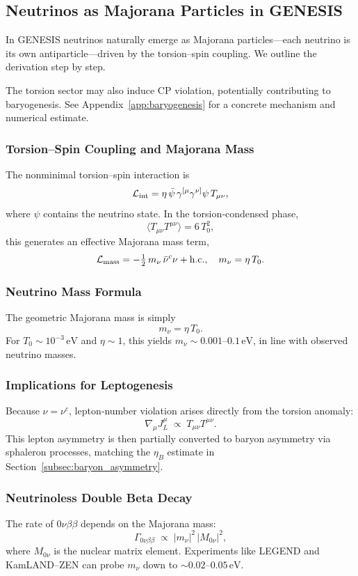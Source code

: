 \documentclass{article}
\begin{document}
\subsection{Neutrinos as Majorana Particles in GENESIS}
\label{subsec:majorana_neutrino}

In GENESIS neutrinos naturally emerge as Majorana particles—each neutrino
is its own antiparticle—driven by the torsion–spin coupling.  We outline the
derivation step by step.

The torsion sector may also induce CP violation, potentially contributing to baryogenesis.
See Appendix~\ref{app:baryogenesis} for a concrete mechanism and numerical estimate.


\subsubsection{ Torsion–Spin Coupling and Majorana Mass}
The nonminimal torsion–spin interaction is
\[
  \mathcal L_{\rm int}
  = \eta\,\bar\psi\,\gamma^{[\mu}\gamma^{\nu]}\psi\,T_{\mu\nu},
\]
where \(\psi\) contains the neutrino state.  In the torsion‐condensed phase,
\[
  \bigl\langle T_{\mu\nu}T^{\mu\nu}\bigr\rangle
    = 6\,T_0^2,
\]
this generates an effective Majorana mass term,
\[
  \mathcal L_{\rm mass}
  = -\tfrac12\,m_\nu\,\bar\nu^c\nu
    + \text{h.c.}, 
  \quad
  m_\nu = \eta\,T_0.
\]

\subsubsection{ Neutrino Mass Formula}
The geometric Majorana mass is simply
\[
  \boxed{m_\nu = \eta\,T_0}.
\]
For \(T_0\sim10^{-3}\,\mathrm{eV}\) and \(\eta\sim1\), this yields
\(m_\nu\sim0.001\)–\(0.1\,\mathrm{eV}\), in line with observed neutrino masses.

\subsubsection{ Implications for Leptogenesis}
Because \(\nu=\nu^c\), lepton‐number violation arises directly from the torsion
anomaly:
\[
  \nabla_\mu J_L^\mu
  \;\propto\;
    T_{\mu\nu}T^{\mu\nu}.
\]
This lepton asymmetry is then partially converted to baryon asymmetry via
sphaleron processes, matching the \(\eta_B\) estimate in Section~\ref{subsec:baryon_asymmetry}.

\subsubsection{ Neutrinoless Double Beta Decay}
The rate of \(0\nu\beta\beta\) depends on the Majorana mass:
\[
  \Gamma_{0\nu\beta\beta}
  \;\propto\; |m_\nu|^2\,|M_{0\nu}|^2,
\]
where \(M_{0\nu}\) is the nuclear matrix element.  Experiments like LEGEND
and KamLAND–ZEN can probe \(m_\nu\) down to \(\sim0.02\)–\(0.05\,\mathrm{eV}\).
\end{document}
